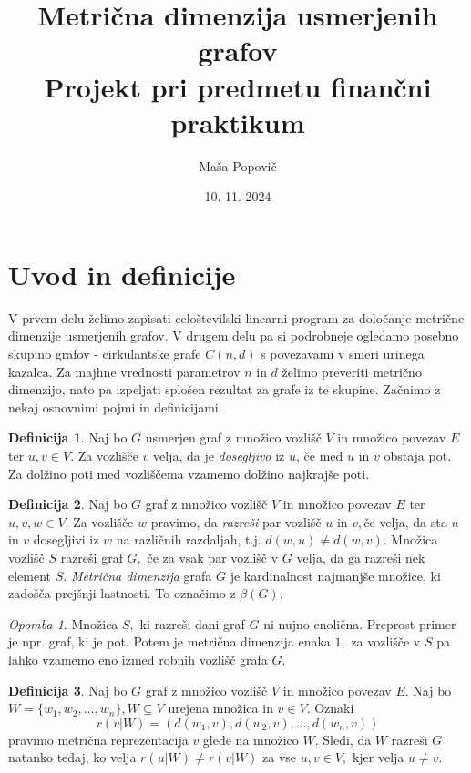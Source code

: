 \documentclass[a4paper,12pt]{article}
\title{
  Metrična dimenzija usmerjenih grafov \\
  \large Projekt pri predmetu finančni praktikum\\}
\author{Maša Popovič}
\date{10. 11. 2024}
\theoremstyle{definition}
\newtheorem{definicija}{Definicija}[section]
\theoremstyle{remark}
\newtheorem*{opomba}{Opomba}
\theoremstyle{definition}
\begin{document}
\maketitle

\section{Uvod in definicije}

V prvem delu želimo zapisati celoštevilski linearni program za določanje metrične dimenzije usmerjenih grafov. V drugem delu 
pa si podrobneje ogledamo posebno skupino grafov - cirkulantske grafe $C(n, d)$ s povezavami v smeri
urinega kazalca. Za majhne vrednosti parametrov $n$ in  $d$ želimo preveriti metrično dimenzijo, nato 
pa izpeljati splošen rezultat za grafe iz te skupine. Začnimo z nekaj osnovnimi pojmi
in definicijami. 

\begin{definicija}
    Naj bo $G$ usmerjen graf z množico vozlišč $V$ in 
    množico povezav $E$ ter $u,v \in V.$ Za vozlišče $v$ velja, da je \textit{dosegljivo}
    iz $u$, če med $u$ in $v$ obstaja pot. Za dolžino poti med vozliščema vzamemo dolžino
    najkrajše poti.
    \\
\end{definicija}


\begin{definicija}
    Naj bo $G$ graf z množico vozlišč $V$ in množico povezav $E$ ter $u,v,w \in V.$ Za vozlišče 
    $w$ pravimo, da \textit{razreši} par vozlišč $u$ in $v,$če velja, da sta $u$ in $v$ dosegljivi
    iz $w$ na različnih razdaljah, t.j. $d(w,u) \neq d(w,v).$ Množica vozlišč $S$ razreši graf $G,$ če 
    za vsak par vozlišč v $G$ velja, da ga razreši nek element $S.$ \textit{Metrična dimenzija} grafa $G$
    je kardinalnost najmanjše množice, ki zadošča prejšnji lastnosti. To označimo z $\beta(G).$
    \\
\end{definicija}

\begin{opomba}
    Množica $S,$ ki razreši dani graf $G$ ni nujno enolična. Preprost primer je npr. graf, ki je pot. Potem je 
    metrična dimenzija enaka $1,$ za vozlišče v $S$ pa lahko vzamemo eno izmed robnih vozlišč grafa $G.$
    \\
\end{opomba}

\begin{definicija}
    Naj bo $G$ graf z množico vozlišč $V$ in množico povezav $E.$
    Naj bo $W = \{w_1, w_2, \dots ,w_n \},  W \subseteq V$ urejena množica in $v \in V.$
    Oznaki $$r(v|W) = (d (w_1,v), d(w_2,v), \dots ,d(w_n,v))$$ pravimo metrična 
    reprezentacija $v$ glede na množico $W.$ Sledi, da $W$ razreši $G$ natanko tedaj, ko velja 
    $r(u|W) \neq r(v|W)$ za vse $u,v \in V,$ kjer velja $u \neq v.$
    \\
\end{definicija}
\end{document}
